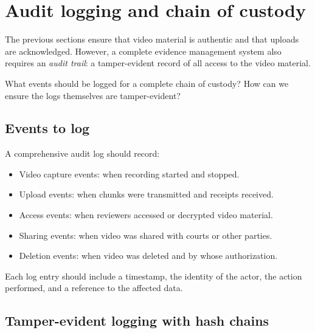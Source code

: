 \section{Audit logging and chain of custody}\label{AuditLogging}


The previous sections ensure that video material is authentic and that uploads 
are acknowledged.
However, a complete evidence management system also requires an \emph{audit 
trail}: a tamper-evident record of all access to the video material.

\begin{exercise}
  What events should be logged for a complete chain of custody?
  How can we ensure the logs themselves are tamper-evident?
\end{exercise}

\subsection{Events to log}

A comprehensive audit log should record:
\begin{itemize}
  \item Video capture events: when recording started and stopped.
  \item Upload events: when chunks were transmitted and receipts received.
  \item Access events: when reviewers accessed or decrypted video material.
  \item Sharing events: when video was shared with courts or other parties.
  \item Deletion events: when video was deleted and by whose authorization.
\end{itemize}

Each log entry should include a timestamp, the identity of the actor, the 
action performed, and a reference to the affected data.

\subsection{Tamper-evident logging with hash chains}

